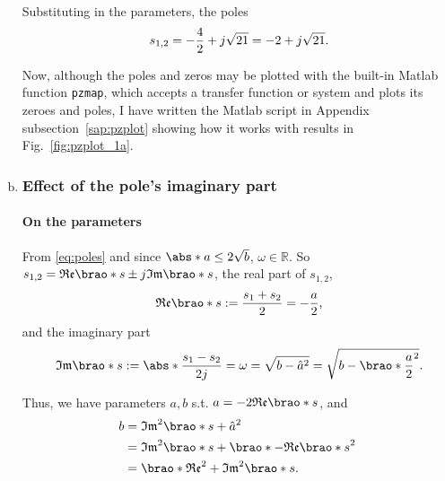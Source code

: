 \documentclass[12pt]{article}
\DeclarePairedDelimiter\brao()%
\DeclarePairedDelimiter\abs||
\begin{document}
\begin{enumerate}[(a)]
        Substituting in the parameters, the poles
        \begin{equation}
            s_{1,2} = -\frac42 + j\sqrt{21} = -2 + j\sqrt{21}\rlap.
        \end{equation}

        Now, although the poles and zeros may be plotted with the built-in Matlab function \texttt{pzmap}, which accepts a transfer function or system and plots its zeroes and poles,
        I have written the Matlab script in Appendix subsection~\ref{sap:pzplot} showing how it works with results in Fig.~\ref{fig:pzplot_1a}.

    \item
        \subsubsection{Effect of the pole's imaginary part}
        \paragraph{On the parameters}
        From \eqref{eq:poles} and since $\abs*{a} \leq 2\sqrt{b}$, $\omega\in\mathbb{R}$. So $s_{1,2} = \mathfrak{Re}\brao*s \pm j\mathfrak{Im}\brao*s$,
        the real part of $s_{1,2}$,
        \begin{equation}
            \mathfrak{Re}\brao*s := \frac{s_1 + s_2}2
            = -\frac{a}2\rlap,
        \end{equation}
        and the imaginary part
        \begin{equation}
            \mathfrak{Im}\brao*s := \abs*{\frac{s_1 - s_2}{2j}} = \omega = \sqrt{b - \hat{a}^2} = \sqrt{b - \brao*{\frac{a}2}^2}\rlap.
        \end{equation}

        Thus, we have parameters $a,b$ s.t. $a = -2 \mathfrak{Re}\brao*s$, and
        \begin{equation}
            \begin{aligned}
                b &{}= \mathfrak{Im}^2\brao*s + \hat{a}^2
            \\*
                & {}= \mathfrak{Im}^2\brao*s + \brao*{-\mathfrak{Re}\brao*s}^2
            \\*
                & {}= \brao*{\mathfrak{Re}^2 + \mathfrak{Im}^2}\brao*s.
            \\*
            \end{aligned}
        \end{equation}


\end{enumerate}
\end{document}
